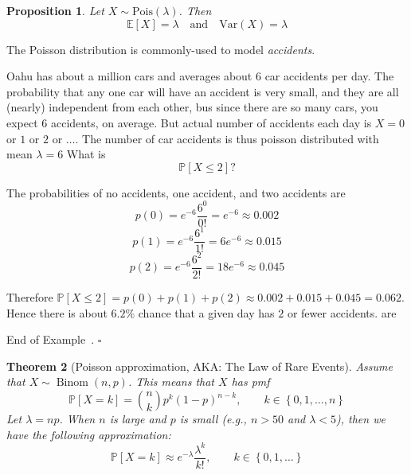 \documentclass[10pt]{article}
\newtheorem{theorem}{Theorem}
\newtheorem{proposition}[theorem]{Proposition}
\theoremstyle{definition}
\newtheorem{example}[theorem]{Example}
\renewenvironment{example}
{\begin{oldexample}}
  {\par\smallskip\hfill   End of Example~\theexample. $\square$    \par\end{oldexample}}
\newcommand{\1}[1]{\textbf{1}_{\left[#1\right]}} %
\def\E{\mathbb{E}} %
\def\P{\mathbb{P}} %
\def\Var{\mathrm{Var}} %
\begin{document}
\begin{proposition}
  Let $X\sim \text{Pois}(\lambda)$. Then
  \begin{equation*}
    \E\left[X \right]= \lambda \quad \text{and} \quad \Var(X) = \lambda
  \end{equation*}
\end{proposition}

The Poisson distribution is commonly-used to model \textit{accidents}.

\begin{example}
  \label{ex:poisson-car-accidents}
  Oahu has about a million cars and averages about 6 car accidents per day. The probability that any one
  car will have an accident is very small, and they are all (nearly) independent from each other, bus
  since there are so many cars, you expect 6 accidents, on average. But actual number of accidents each
  day is $X=0$ or $1$ or $2$ or $\ldots$. The number of car accidents is thus poisson distributed with
  mean $\lambda=6$ What is
  \begin{equation*}
    \P\left[X \leq 2\right]?
  \end{equation*}
  
  The probabilities of no accidents, one accident, and two accidents
  are
  \begin{equation*}
    p(0) = e^{-6} \frac{6^{0}}{0!} = e^{-6} \approx 0.002
  \end{equation*}
  \begin{equation*}
    p(1) = e^{-6} \frac{6^{1}}{1!} = 6e^{-6} \approx 0.015
  \end{equation*}
  \begin{equation*}
    p(2) = e^{-6} \frac{6^{2}}{2!} = 18e^{-6} \approx 0.045
  \end{equation*}

  Therefore $\P \left[ X \leq 2\right] = p(0)+p(1)+p(2)\approx
  0.002+0.015+0.045  = 0.062$. Hence there is about $6.2\%$ chance that a
  given day has $2$ or fewer accidents.
  are 
\end{example}



\begin{theorem}[Poisson approximation, AKA: The Law of Rare Events]
  \label{thm:law-of-rare-events}
  Assume that $X \sim \operatorname{Binom}(n,p)$. This means that $X$ has pmf
  \begin{equation*}
    \P\left[X = k \right] = {n\choose k}p^{k}(1-p)^{n-k}, \qquad k\in \left\{0,1,\ldots,n\right\} 
  \end{equation*}
  Let $\lambda=np$. When $n$ is large and $p$ is small (e.g., $n>50$ and $\lambda<5$), then we have the
  following approximation:
  \begin{equation*}
    \P\left[X  = k \right] \approx e^{-\lambda}\frac{\lambda^{k}}{k!}, \qquad k\in \left\{0,1,\ldots\right\} 
  \end{equation*}
\end{theorem}
\end{document}
